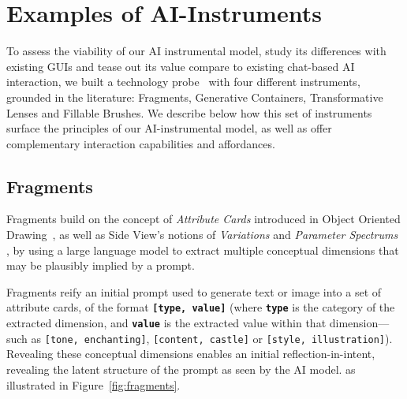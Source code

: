 
\section{Examples of AI-Instruments}
\label{sec:Ai-instruments}
To assess the viability of our AI instrumental model, study its differences with existing GUIs and tease out its value compare to existing chat-based AI interaction, we built a technology probe~\cite{TechnologyProbesCHI2003} with four different instruments, grounded in the literature: Fragments, Generative Containers, Transformative Lenses and Fillable Brushes. 
We describe below how this set of instruments surface the principles of our AI-instrumental model, as well as offer complementary interaction capabilities and affordances.




\subsection{Fragments}
 Fragments build on the concept of \textit{Attribute Cards} introduced in Object Oriented Drawing~\cite{xia2016object}, as well as Side View's notions of \textit{Variations} and \textit{Parameter Spectrums} \cite{TerryCreativeNeedsUIDesign2002, TerrySideViews2002}, by using a large language model to extract multiple conceptual dimensions that may be plausibly implied by a prompt. 
 
 Fragments reify an initial prompt used to generate text or image into a set of attribute cards, of the format \texttt{\textbf{[type, value]}} (where \texttt{\textbf{type}} is the category of the extracted dimension, and \texttt{\textbf{value}} is the extracted value within that dimension---such as  \texttt{[tone, enchanting]}, \texttt{[content, castle]} or \texttt{[style, illustration]}). 
 Revealing these conceptual dimensions enables an initial reflection-in-intent, revealing the latent structure of the prompt as seen by the AI model.  as illustrated in Figure~\ref{fig:fragments}.
 
